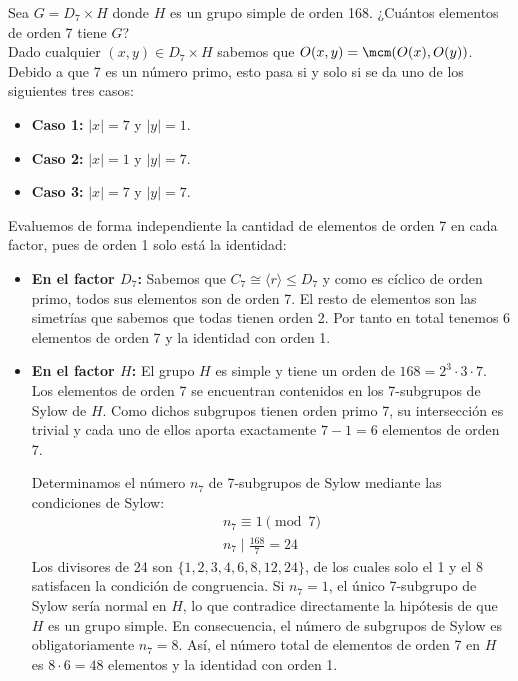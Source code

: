 \documentclass[12pt]{article}
\begin{document}
    \begin{ejercicio}[0.5 puntos] Sea $G = D_7 \times H$ donde $H$ es un grupo simple de orden 168. ¿Cuántos elementos de orden 7 tiene $G$?\\
        Dado cualquier $(x,y) \in D_7 \times H$ sabemos que $O(x, y) = \mcm(O(x), O(y))$. Debido a que 7 es un número primo, esto pasa si y solo si se da uno de los siguientes tres casos:
        \begin{itemize}
            \item \textbf{Caso 1:} $|x| = 7$ y $|y| = 1$.
            \item \textbf{Caso 2:} $|x| = 1$ y $|y| = 7$.
            \item \textbf{Caso 3:} $|x| = 7$ y $|y| = 7$.
        \end{itemize}
        
        Evaluemos de forma independiente la cantidad de elementos de orden 7 en cada factor, pues de orden 1 solo está la identidad:
        \begin{itemize}
            \item \textbf{En el factor $D_7$:} Sabemos que $C_7\cong \langle r\rangle \le D_7$ y como es cíclico de orden primo, todos sus elementos son de orden 7. El resto de elementos son las simetrías que sabemos que todas tienen orden 2.
            Por tanto en total tenemos 6 elementos de orden 7 y la identidad con orden 1. 
            
            \item \textbf{En el factor $H$:} El grupo $H$ es simple y tiene un orden de $168 = 2^3 \cdot 3 \cdot 7$.
            Los elementos de orden 7 se encuentran contenidos en los 7-subgrupos de Sylow de $H$.
            Como dichos subgrupos tienen orden primo 7, su intersección es trivial y cada uno de ellos aporta exactamente $7 - 1 = 6$ elementos de orden 7.
            
            Determinamos el número $n_7$ de 7-subgrupos de Sylow mediante las condiciones de Sylow:
            \begin{align*}
                n_7 \equiv 1 \pmod 7\\
                n_7 \mid \frac{168}{7} = 24
            \end{align*}
            Los divisores de 24 son $\{1, 2, 3, 4, 6, 8, 12, 24\}$, de los cuales solo el 1 y el 8 satisfacen la condición de congruencia. 
            Si $n_7 = 1$, el único 7-subgrupo de Sylow sería normal en $H$, lo que contradice directamente la hipótesis de que $H$ es un grupo simple. 
            En consecuencia, el número de subgrupos de Sylow es obligatoriamente $n_7 = 8$. Así, el número total de elementos de orden 7 en $H$ es $8 \cdot 6 = 48$ elementos y la identidad con orden 1.
        \end{itemize}
        

\end{ejercicio}
\end{document}
